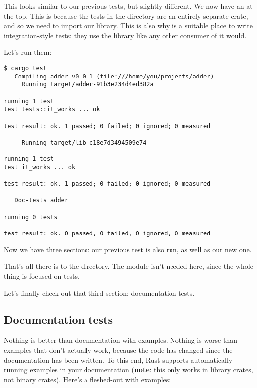 This looks similar to our previous tests, but slightly different. We now have an  at the top. This is 
because the tests in the  directory are an entirely separate crate, and so we need to import our library. This is also 
why  is a suitable place to write integration-style tests: they use the library like any other consumer of it would.

\blank

Let's run them:

\begin{verbatim}
$ cargo test
   Compiling adder v0.0.1 (file:///home/you/projects/adder)
     Running target/adder-91b3e234d4ed382a

running 1 test
test tests::it_works ... ok

test result: ok. 1 passed; 0 failed; 0 ignored; 0 measured

     Running target/lib-c18e7d3494509e74

running 1 test
test it_works ... ok

test result: ok. 1 passed; 0 failed; 0 ignored; 0 measured

   Doc-tests adder

running 0 tests

test result: ok. 0 passed; 0 failed; 0 ignored; 0 measured
\end{verbatim}

Now we have three sections: our previous test is also run, as well as our new one.

\blank

That's all there is to the  directory. The  module isn't needed here, since the whole thing is focused on tests.

\blank

Let's finally check out that third section: documentation tests.

\subsection*{Documentation tests}

Nothing is better than documentation with examples. Nothing is worse than examples that don't actually work, because the code has 
changed since the documentation has been written. To this end, Rust supports automatically running examples in your documentation 
(\textbf{note}: this only works in library crates, not binary crates). Here's a fleshed-out  with examples:


